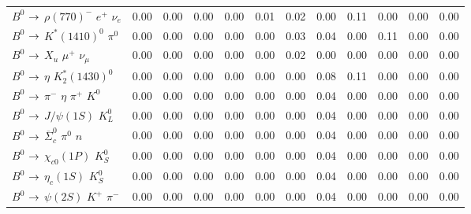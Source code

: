 {\begin{tabular}{lrrrrrrrrrrr}
$B^{0}$ $\rightarrow$ $\rho(770)^{-}$ $e^{+}$ $\nu_{e}$         &         0.00 &         0.00 &         0.00 &         0.00 &         0.01 &         0.02 &         0.00 &         0.11 &         0.00 &         0.00 &         0.00 \\
$B^{0}$ $\rightarrow$ $K^{*}(1410)^{0}$ $\pi^{0}$               &         0.00 &         0.00 &         0.00 &         0.00 &         0.00 &         0.03 &         0.04 &         0.00 &         0.11 &         0.00 &         0.00 \\
$B^{0}$ $\rightarrow$ $X_u$ $\mu^{+}$ $\nu_{\mu}$                 &         0.00 &         0.00 &         0.00 &         0.00 &         0.00 &         0.02 &         0.00 &         0.00 &         0.00 &         0.00 &         0.00 \\
$B^{0}$ $\rightarrow$ $\eta$ $K_{2}^{*}(1430)^{0}$              &         0.00 &         0.00 &         0.00 &         0.00 &         0.00 &         0.00 &         0.08 &         0.11 &         0.00 &         0.00 &         0.00 \\
$B^{0}$ $\rightarrow$ $\pi^{-}$ $\eta$ $\pi^{+}$ $K^{0}$        &         0.00 &         0.00 &         0.00 &         0.00 &         0.00 &         0.00 &         0.04 &         0.00 &         0.00 &         0.00 &         0.00 \\
$B^{0}$ $\rightarrow$ $J/\psi(1S)$ $K_{L}^{0}$                  &         0.00 &         0.00 &         0.00 &         0.00 &         0.00 &         0.00 &         0.04 &         0.00 &         0.00 &         0.00 &         0.00 \\
$B^{0}$ $\rightarrow$ $\overline{\Sigma}_{c}^{0}$ $\pi^{0}$ $n$ &         0.00 &         0.00 &         0.00 &         0.00 &         0.00 &         0.00 &         0.04 &         0.00 &         0.00 &         0.00 &         0.00 \\
$B^{0}$ $\rightarrow$ $\chi_{c0}(1P)$ $K_{S}^{0}$               &         0.00 &         0.00 &         0.00 &         0.00 &         0.00 &         0.00 &         0.04 &         0.00 &         0.00 &         0.00 &         0.00 \\
$B^{0}$ $\rightarrow$ $\eta_{c}(1S)$ $K_{S}^{0}$                &         0.00 &         0.00 &         0.00 &         0.00 &         0.00 &         0.00 &         0.04 &         0.00 &         0.00 &         0.00 &         0.00 \\
$B^{0}$ $\rightarrow$ $\psi(2S)$ $K^{+}$ $\pi^{-}$              &         0.00 &         0.00 &         0.00 &         0.00 &         0.00 &         0.00 &         0.04 &         0.00 &         0.00 &         0.00 &         0.00 \\

\end{tabular}}
